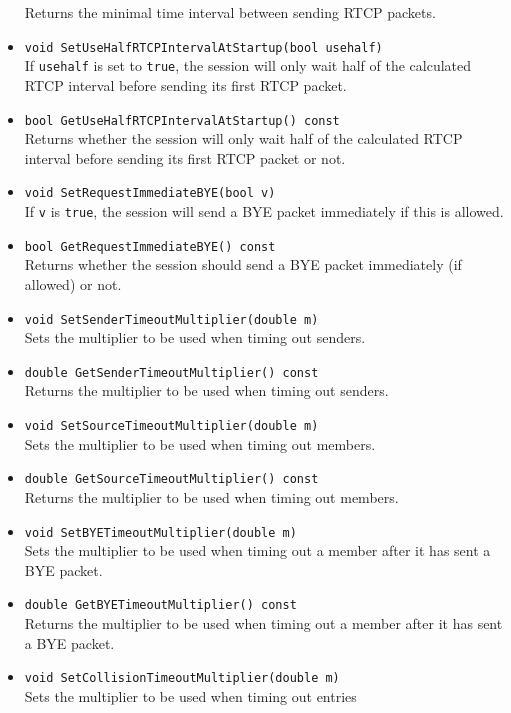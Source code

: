 \documentclass[12pt,a4paper]{article}
\begin{document}
\begin{itemize}
						Returns the minimal time interval between sending RTCP packets.
					\item {\tt void SetUseHalfRTCPIntervalAtStartup(bool usehalf)}\\
						If {\tt usehalf} is set to {\tt true}, the session will only
						wait half of the calculated RTCP interval before sending its
						first RTCP packet.
					\item {\tt bool GetUseHalfRTCPIntervalAtStartup() const}\\
						Returns whether the session will only
						wait half of the calculated RTCP interval before sending its
						first RTCP packet or not.
					\item {\tt void SetRequestImmediateBYE(bool v) }\\
						If {\tt v} is {\tt true}, the session will send a BYE
						packet immediately if this is allowed.
					\item {\tt bool GetRequestImmediateBYE() const}\\
						Returns whether the session should send a BYE packet immediately
						(if allowed) or not.
					\item {\tt void SetSenderTimeoutMultiplier(double m)}\\
						Sets the multiplier to be used when timing out senders.
					\item {\tt double GetSenderTimeoutMultiplier() const}\\
						Returns the multiplier to be used when timing out senders.
					\item {\tt void SetSourceTimeoutMultiplier(double m)}\\
						Sets the multiplier to be used when timing out members.
					\item {\tt double GetSourceTimeoutMultiplier() const}\\
						Returns the multiplier to be used when timing out members.
					\item {\tt void SetBYETimeoutMultiplier(double m)}\\
						Sets the multiplier to be used when timing out a member after
						it has sent a BYE packet.
					\item {\tt double GetBYETimeoutMultiplier() const}\\
						Returns the multiplier to be used when timing out a member after
						it has sent a BYE packet.
					\item {\tt void SetCollisionTimeoutMultiplier(double m)}\\
						Sets the multiplier to be used when timing out entries

\end{itemize}
\end{document}
